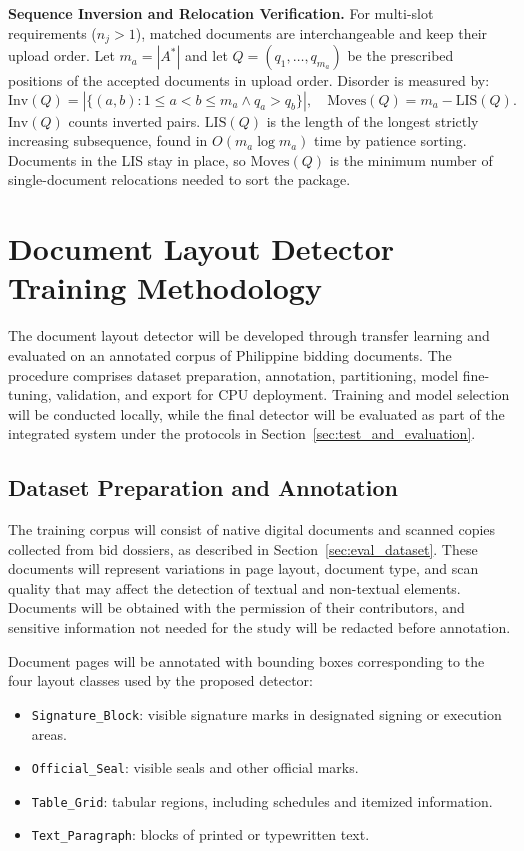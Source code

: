 \textbf{Sequence Inversion and Relocation Verification.} For multi-slot requirements ($n_j > 1$), matched documents are interchangeable and keep their upload order. Let $m_a = |A^*|$ and let $Q = (q_1, \dots, q_{m_a})$ be the prescribed positions of the accepted documents in upload order. Disorder is measured by:
\begin{equation}
\label{eq:disorder_metrics}
\mathrm{Inv}(Q) = \left|\{(a, b) : 1 \le a < b \le m_a \wedge q_a > q_b\}\right|, \quad \mathrm{Moves}(Q) = m_a - \mathrm{LIS}(Q).
\end{equation}
$\mathrm{Inv}(Q)$ counts inverted pairs. $\mathrm{LIS}(Q)$ is the length of the longest strictly increasing subsequence, found in $O(m_a \log m_a)$ time by patience sorting. Documents in the LIS stay in place, so $\mathrm{Moves}(Q)$ is the minimum number of single-document relocations needed to sort the package.

\section{Document Layout Detector Training Methodology}
\label{sec:detector_training}

The document layout detector will be developed through transfer learning and evaluated on an annotated corpus of Philippine bidding documents. The procedure comprises dataset preparation, annotation, partitioning, model fine-tuning, validation, and export for CPU deployment. Training and model selection will be conducted locally, while the final detector will be evaluated as part of the integrated system under the protocols in Section~\ref{sec:test_and_evaluation}.

\subsection{Dataset Preparation and Annotation}
\label{sec:training_dataset}

The training corpus will consist of native digital documents and scanned copies collected from bid dossiers, as described in Section~\ref{sec:eval_dataset}. These documents will represent variations in page layout, document type, and scan quality that may affect the detection of textual and non-textual elements. Documents will be obtained with the permission of their contributors, and sensitive information not needed for the study will be redacted before annotation.

Document pages will be annotated with bounding boxes corresponding to the four layout classes used by the proposed detector:
\begin{itemize}
    \item \texttt{Signature\_Block}: visible signature marks in designated signing or execution areas.
    \item \texttt{Official\_Seal}: visible seals and other official marks.
    \item \texttt{Table\_Grid}: tabular regions, including schedules and itemized information.
    \item \texttt{Text\_Paragraph}: blocks of printed or typewritten text.
\end{itemize}

